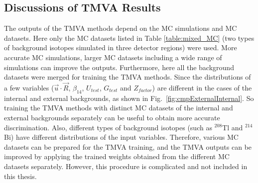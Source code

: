 	
%

\subsection{Discussions of TMVA Results}\label{sect:TMVAdiscussion}

The outputs of the TMVA methods depend on the MC simulations and MC datasets. Here only the MC datasets listed in Table \ref{table:mixed_MC} (two types of background isotopes simulated in three detector regions) were used. More accurate MC simulations, larger MC datasets including a wide range of simulations can improve the outputs. Furthermore, here all the background datasets were merged for training the TMVA methods. Since the distributions of a few variables ($\vec{u}\cdot\vec{R}$, $\beta_{14}$, $U_{test}$, $G_{test}$ and $Z_{factor}$) are different in the cases of the internal and external backgrounds, as shown in Fig.~\ref{fig:cmpExternalInternal}. So training the TMVA methods with distinct MC datasets of the internal and external backgrounds separately can be useful to obtain more accurate discrimination. Also, different types of background isotopes (such as $^{208}$Tl and $^{214}$Bi) have different distributions of the input variables. Therefore, various MC datasets can be prepared for the TMVA training, and the TMVA outputs can be improved by applying the trained weights obtained from the different MC datasets separately. However, this procedure is complicated and not included in this thesis. 

